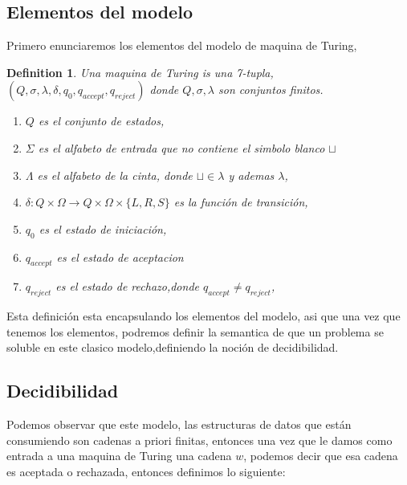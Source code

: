 \documentclass[10pt]{report}
\newtheorem{definition}{Definition}
\begin{document}
    \subsection{Elementos del modelo}\label{subsec:elementos-del-modelo-de-maquina-de-turing}
    Primero enunciaremos los elementos del modelo de maquina de Turing,
    \begin{definition}%
        Una maquina de Turing is una 7-tupla, $(Q,\sigma,\lambda,\delta,q_{0},q_{accept},q_{reject})$
        donde $Q,\sigma,\lambda$ son conjuntos finitos.
        \begin{enumerate}
            \item $Q$ es el conjunto de estados,
            \item $\Sigma$ es el alfabeto de entrada que no contiene el simbolo blanco $\sqcup$
            \item $\Lambda$ es el alfabeto de la cinta, donde  $\sqcup\in\lambda$ y ademas $\lambda$,
            \item $\delta: Q\times\Omega \rightarrow Q\times\Omega\times\{L,R,S\}$ es la función de transición,
            \item $q_{0}$ es el estado de iniciación,
            \item $q_{accept}$ es el estado de aceptacion
            \item $q_{reject}$ es el estado de rechazo,donde $q_{accept} \neq q_{reject}$,

        \end{enumerate}

    \end{definition}
    Esta definición esta encapsulando los elementos del modelo,
    asi que una vez que tenemos los elementos, podremos definir la semantica
    de que un problema se soluble en este clasico modelo,definiendo
    la noción de decidibilidad.
    \space
    \subsection{Decidibilidad}\label{subsec:decidibilidad2}
    Podemos observar que este modelo, las estructuras de datos que están consumiendo
    son cadenas a priori finitas, entonces una vez que le damos como entrada a una maquina de
    Turing una cadena $w$, podemos decir que esa cadena es aceptada o rechazada,
    entonces definimos lo siguiente:
\end{document}
